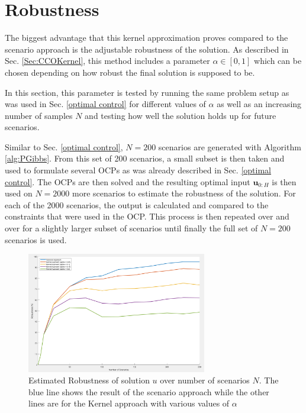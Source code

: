 \section{Robustness} \label{performance guarantees}

The biggest advantage that this kernel approximation proves compared to the scenario approach is the adjustable robustness of the solution. As described in Sec. \ref{Sec:CCOKernel}, this method includes a parameter $\alpha \in [0, 1]$ which can be chosen depending on how robust the final solution is supposed to be. 

In this section, this parameter is tested by running the same problem setup as was used in Sec. \ref{optimal control} for different values of $\alpha$ as well as an increasing number of samples $N$ and testing how well the solution holds up for future scenarios.

Similar to Sec. \ref{optimal control}, $N = 200$ scenarios are generated with Algorithm \ref{alg:PGibbs}. From this set of 200 scenarios, a small subset is then taken and used to formulate several OCPs as was already described in Sec. \ref{optimal control}. The OCPs are then solved and the resulting optimal input $\boldsymbol{u}_{0:H}$ is then used on $N = 2000$ more scenarios to estimate the robustness of the solution. For each of the 2000 scenarios, the output is calculated and compared to the constraints that were used in the OCP. This process is then repeated over and over for a slightly larger subset of scenarios until finally the full set of $N = 200$ scenarios is used.

\begin{figure}[htb]
\centering
\includegraphics[width=0.7\textwidth]{pics/robustness_plot.png}
\caption{Estimated Robustness of solution $u$ over number of scenarios $N$. The blue line shows the result of the scenario approach while the other lines are for the Kernel approach with various values of $\alpha$}
\label{fig:robustness_plot}
\end{figure}


